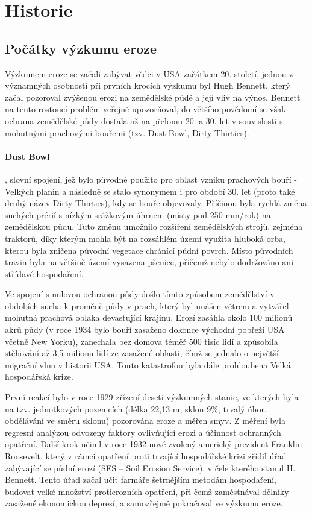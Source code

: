 \section{Historie}
\subsection{Počátky výzkumu eroze}
Výzkumem eroze se začali zabývat vědci v USA začátkem 20. století, jednou z významných osobností při prvních krocích výzkumu byl Hugh Bennett, který začal pozoroval zvýšenou erozi na zemědělské půdě a její vliv na výnos. Bennett na tento rostoucí problém veřejně upozorňoval, do většího povědomí se však ochrana zemědělské půdy dostala až na přelomu 20. a 30. let v souvislosti s mohutnými prachovými bouřemi (tzv. Dust Bowl, Dirty Thirties).

\paragraph{Dust Bowl}, slovní spojení, jež bylo původně použito pro oblast vzniku prachových bouří -  Velkých planin a následně se stalo synonymem i pro období 30. let (proto také druhý název Dirty Thirties), kdy se bouře objevovaly. Příčinou byla rychlá změna suchých prérií s nízkým srážkovým úhrnem (místy pod 250 mm/rok) na zemědělskou půdu. Tuto změnu umožnilo rozšíření zemědělských strojů, zejména traktorů, díky kterým mohla být na rozsáhlém území využita hluboká orba, kterou byla zničena původní vegetace chránící půdní povrch. Místo původních travin byla na většině území vysazena pšenice, přičemž nebylo dodržováno ani střídavé hospodaření. 

Ve spojení s nulovou ochranou půdy došlo tímto způsobem zemědělství v obdobích sucha k proměně půdy v prach, který byl unášen větrem a vytvářel mohutná prachová oblaka devastující krajinu. Erozí zasáhla okolo 100 milionů akrů půdy (v roce 1934 bylo bouří zasaženo dokonce východní pobřeží USA včetně New Yorku), zanechala bez domova téměř 500 tisíc lidí a způsobila stěhování až 3,5 milionu lidí ze zasažené oblasti, čímž se jednalo o největší migrační vlnu v historii USA. Touto katastrofou byla dále prohloubena Velká hospodářská krize.

První reakcí bylo v roce 1929 zřízení deseti výzkumných stanic, ve kterých byla na tzv. jednotkových pozemcích (délka 22,13 m, sklon 9$\%$, trvalý úhor, obdělávání ve směru sklonu) pozorována eroze a měřen smyv. Z měření byla regresní analýzou odvozeny faktory ovlivňující erozi a účinnost ochranných opatření. Další krok učinil v roce 1932 nově zvolený americký prezident Franklin Roosevelt, který v rámci opatření proti trvající hospodářské krizi zřídil úřad zabývající se půdní erozí (SES – Soil Erosion Service), v čele kterého stanul H. Bennett. Tento úřad začal učit farmáře šetrnějším metodám hospodaření, budovat velké množství protierozních opatření, při čemž zaměstnával dělníky zasažené ekonomickou depresí, a samozřejmě pokračoval ve výzkumu eroze.

